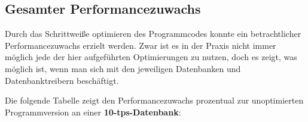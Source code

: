 \clearpage

% 
% 
% 

\subsection{Gesamter Performancezuwachs}
Durch das Schrittweiße optimieren des Programmcodes konnte ein betrachtlicher
Performancezuwachs erzielt werden. Zwar ist es in der Praxis nicht immer möglich
jede der hier aufgeführten Optimierungen zu nutzen, doch es zeigt, was möglich
ist, wenn man sich mit den jeweiligen Datenbanken und Datenbanktreibern beschäftigt.

Die folgende Tabelle zeigt den Performancezuwachs prozentual zur unoptimierten
Programmversion an einer \textbf{10-tps-Datenbank}: 



\clearpage
